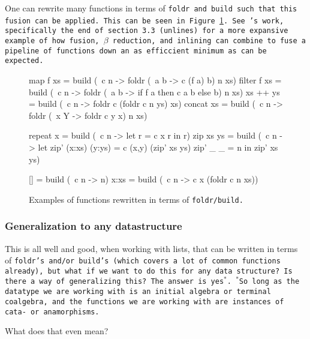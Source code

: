 One can rewrite many functions in terms of \tt{foldr} and \tt{build} such that this fusion can be applied. This can be seen in Figure \ref{fig:foldr/build_ex}.
See \cite{Gill1993}'s work, specifically the end of section 3.3 (\tt{unlines}) for a more expansive example of how fusion, $\beta$ reduction, and inlining can combine to fuse a pipeline of functions down an as efficcient minimum as can be expected.
\begin{figure}[h]
    \centering
    \begin{code}
    map f xs    = build (\ c n -> foldr (\ a b -> c (f a) b) n xs)
    filter f xs = build (\ c n -> foldr (\ a b -> if f a then c a b else b) n xs)
    xs ++ ys    = build (\ c n -> foldr c (foldr c n ys) xs)
    concat xs   = build (\ c n -> foldr (\ x Y -> foldr c y x) n xs)
    
    repeat x    = build (\ c n -> let r = c x r in r)
    zip xs ys   = build (\ c n -> let zip' (x:xs) (y:ys) = c (x,y) (zip' xs ys)
                                      zip' _      _      = n
                                      in zip' xs ys)

    []         = build (\ c n -> n)
    x:xs       = build (\ c n -> c x (foldr c n xs))
    \end{code}
    \caption{Examples of functions rewritten in terms of \tt{foldr/build}. \citep{Gill1993}}
    \label{fig:foldr/build_ex}
\end{figure}





\subsubsection{Generalization to any datastructure}
This is all well and good, when working with lists, that can be written in terms of \tt{foldr}'s and/or \tt{build}'s (which covers a lot of common functions already), but what if we want to do this for any data structure? Is there a way of generalizing this?
The answer is yes$^*$. $^*$So long as the datatype we are working with is an initial algebra or terminal coalgebra, and the functions we are working with are instances of cata- or anamorphisms.

What does that even mean?